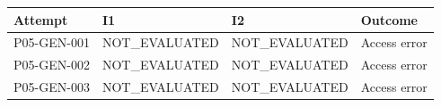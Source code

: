 \begin{tabular}{llll}
\toprule
Attempt & I1 & I2 & Outcome \\
\midrule
P05-GEN-001 & NOT\_EVALUATED & NOT\_EVALUATED & Access error \\
P05-GEN-002 & NOT\_EVALUATED & NOT\_EVALUATED & Access error \\
P05-GEN-003 & NOT\_EVALUATED & NOT\_EVALUATED & Access error \\
\bottomrule
\end{tabular}
